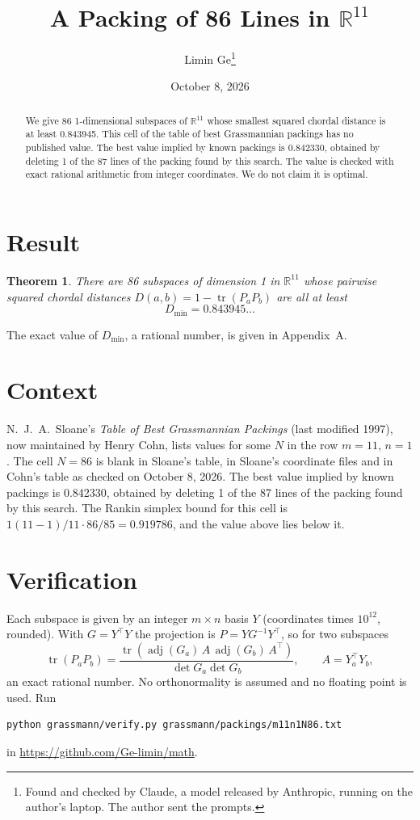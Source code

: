 \documentclass[11pt,a4paper]{article}
\title{A Packing of 86 Lines in $\mathbb{R}^{11}$}
\author{Limin Ge\thanks{Found and checked by Claude, a model released by Anthropic, running on the author's laptop. The author sent the prompts.}}
\date{October 8, 2026}
\newtheorem*{theorem}{Theorem}
\begin{document}
\maketitle
\begin{abstract}
We give 86 1-dimensional subspaces of $\mathbb{R}^{11}$ whose smallest squared chordal distance is at least 0.843945. This cell of the table of best Grassmannian packings has no published value. The best value implied by known packings is 0.842330, obtained by deleting 1 of the 87 lines of the packing found by this search. The value is checked with exact rational arithmetic from integer coordinates. We do not claim it is optimal.
\end{abstract}

\section{Result}
\begin{theorem}
There are 86 subspaces of dimension 1 in $\mathbb{R}^{11}$ whose pairwise squared chordal distances $D(a,b) = 1 - \operatorname{tr}(P_aP_b)$ are all at least
\[ D_{\min} = 0.843945\ldots \]
\end{theorem}
The exact value of $D_{\min}$, a rational number, is given in Appendix~A.


\section{Context}
N.~J.~A.~Sloane's \emph{Table of Best Grassmannian Packings} (last modified 1997), now maintained by Henry Cohn, lists values for some $N$ in the row $m=11$, $n=1$. The cell $N=86$ is blank in Sloane's table, in Sloane's coordinate files and in Cohn's table as checked on October 8, 2026. The best value implied by known packings is 0.842330, obtained by deleting 1 of the 87 lines of the packing found by this search. The Rankin simplex bound for this cell is $1(11-1)/11\cdot 86/85 = 0.919786$, and the value above lies below it.


\section{Verification}
Each subspace is given by an integer $m\times n$ basis $Y$ (coordinates times $10^{12}$, rounded). With $G=Y^\top Y$ the projection is $P=YG^{-1}Y^\top$, so for two subspaces
\[ \operatorname{tr}(P_aP_b)=\frac{\operatorname{tr}(\operatorname{adj}(G_a)\,A\,\operatorname{adj}(G_b)\,A^\top)}{\det G_a\det G_b},\qquad A=Y_a^\top Y_b, \]
an exact rational number. No orthonormality is assumed and no floating point is used. Run
\begin{verbatim}
python grassmann/verify.py grassmann/packings/m11n1N86.txt
\end{verbatim}
in \url{https://github.com/Ge-limin/math}.
\end{document}
